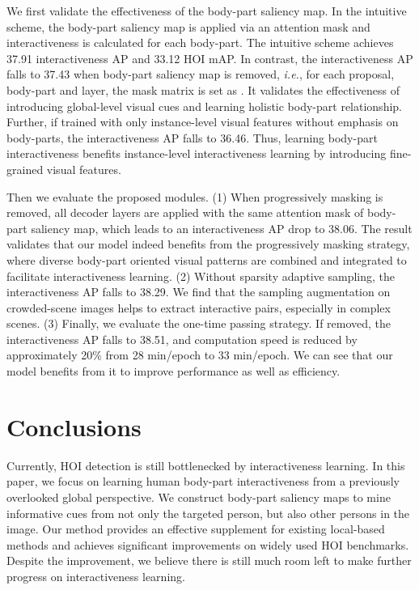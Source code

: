\documentclass[runningheads]{llncs}
\begin{document}
We first validate the effectiveness of the body-part saliency map. In the intuitive scheme, the body-part saliency map is applied via an attention mask and interactiveness is calculated for each body-part. The intuitive scheme achieves 37.91 interactiveness AP and 33.12 HOI mAP. 
In contrast, the interactiveness AP falls to 37.43 when body-part saliency map is removed, 
\textit{i.e.}, for each proposal, body-part and layer, the mask matrix is set as . 
It validates the effectiveness of introducing global-level visual cues and learning holistic body-part relationship. 
Further, if trained with only instance-level visual features without emphasis on body-parts, the interactiveness AP falls to 36.46. Thus, learning body-part interactiveness benefits instance-level interactiveness learning by introducing fine-grained visual features.

Then we evaluate the proposed modules. 
(1) When progressively masking is removed, all decoder layers are applied with the same attention mask of body-part saliency map, which leads to an interactiveness AP drop to 38.06. 
The result validates that our model indeed benefits from the progressively masking strategy, where diverse body-part oriented visual patterns are combined and integrated to facilitate interactiveness learning.
(2) Without sparsity adaptive sampling, the interactiveness AP falls to 38.29. We find that the sampling augmentation on crowded-scene images helps to extract interactive pairs,  especially in complex scenes.
(3) Finally, we evaluate the one-time passing strategy. If removed, the interactiveness AP falls to 38.51, and computation speed is reduced by approximately 20\% from 28 min/epoch to 33 min/epoch. We can see that our model benefits from it to improve performance as well as efficiency.

\section{Conclusions}
Currently, HOI detection is still bottlenecked by interactiveness learning. In this paper, we focus on learning human body-part interactiveness from a previously overlooked global perspective. We construct body-part saliency maps to mine informative cues from not only the targeted person, but also other persons in the image. Our method provides an effective supplement for existing local-based methods and achieves significant improvements on widely used HOI benchmarks. 
Despite the improvement, we believe there is still much room left to make further progress on interactiveness learning.
\end{document}
